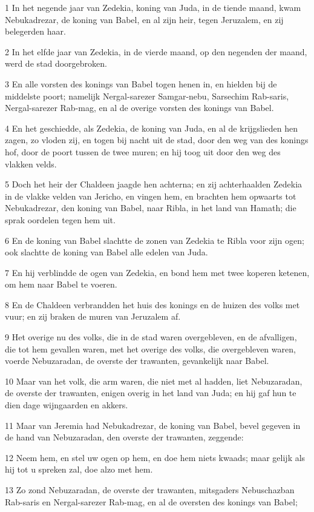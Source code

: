 \par 1 In het negende jaar van Zedekia, koning van Juda, in de tiende maand, kwam Nebukadrezar, de koning van Babel, en al zijn heir, tegen Jeruzalem, en zij belegerden haar.
\par 2 In het elfde jaar van Zedekia, in de vierde maand, op den negenden der maand, werd de stad doorgebroken.
\par 3 En alle vorsten des konings van Babel togen henen in, en hielden bij de middelste poort; namelijk Nergal-sarezer Samgar-nebu, Sarsechim Rab-saris, Nergal-sarezer Rab-mag, en al de overige vorsten des konings van Babel.
\par 4 En het geschiedde, als Zedekia, de koning van Juda, en al de krijgslieden hen zagen, zo vloden zij, en togen bij nacht uit de stad, door den weg van des konings hof, door de poort tussen de twee muren; en hij toog uit door den weg des vlakken velds.
\par 5 Doch het heir der Chaldeen jaagde hen achterna; en zij achterhaalden Zedekia in de vlakke velden van Jericho, en vingen hem, en brachten hem opwaarts tot Nebukadrezar, den koning van Babel, naar Ribla, in het land van Hamath; die sprak oordelen tegen hem uit.
\par 6 En de koning van Babel slachtte de zonen van Zedekia te Ribla voor zijn ogen; ook slachtte de koning van Babel alle edelen van Juda.
\par 7 En hij verblindde de ogen van Zedekia, en bond hem met twee koperen ketenen, om hem naar Babel te voeren.
\par 8 En de Chaldeen verbrandden het huis des konings en de huizen des volks met vuur; en zij braken de muren van Jeruzalem af.
\par 9 Het overige nu des volks, die in de stad waren overgebleven, en de afvalligen, die tot hem gevallen waren, met het overige des volks, die overgebleven waren, voerde Nebuzaradan, de overste der trawanten, gevankelijk naar Babel.
\par 10 Maar van het volk, die arm waren, die niet met al hadden, liet Nebuzaradan, de overste der trawanten, enigen overig in het land van Juda; en hij gaf hun te dien dage wijngaarden en akkers.
\par 11 Maar van Jeremia had Nebukadrezar, de koning van Babel, bevel gegeven in de hand van Nebuzaradan, den overste der trawanten, zeggende:
\par 12 Neem hem, en stel uw ogen op hem, en doe hem niets kwaads; maar gelijk als hij tot u spreken zal, doe alzo met hem.
\par 13 Zo zond Nebuzaradan, de overste der trawanten, mitsgaders Nebuschazban Rab-saris en Nergal-sarezer Rab-mag, en al de oversten des konings van Babel;
